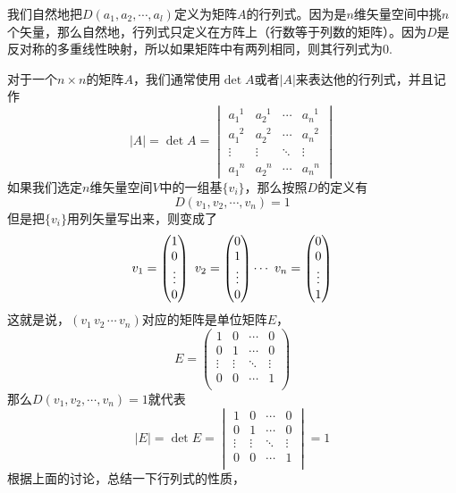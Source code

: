 \documentclass[11pt,a4paper,openany]{book}%
\theoremstyle{plain}%
\begin{document}
\indent 我们自然地把$D(a_1,a_2,\cdots,a_l)$定义为矩阵$A$的行列式。因为是$n$维矢量空间中挑$n$个矢量，那么自然地，行列式只定义在方阵上（行数等于列数的矩阵）。因为$D$是反对称的多重线性映射，所以如果矩阵中有两列相同，则其行列式为0.

对于一个$n\times n$的矩阵$A$，我们通常使用$\det A$或者$|A|$来表达他的行列式，并且记作
\[
|A|=\det A=
\begin{vmatrix}
a_{1}^{\phantom{1}1} & a_{2}^{\phantom{2}1} & \cdots & a_{n}^{\phantom{n}1}\\
a_{1}^{\phantom{1}2} & a_{2}^{\phantom{2}2} & \cdots & a_{n}^{\phantom{n}2}\\
\vdots & \vdots & \ddots & \vdots \\
a_{1}^{\phantom{1}n} & a_{2}^{\phantom{2}n} & \cdots & a_{n}^{\phantom{n}n}
\end{vmatrix}
\]
\indent 如果我们选定$n$维矢量空间$V$中的一组基$\{v_i\}$，那么按照$D$的定义有
\[
D(v_1,v_2,\cdots,v_n)=1
\]
但是把$\{v_i\}$用列矢量写出来，则变成了
\[
v_1=\begin{pmatrix}
1 \\
0 \\
\vdots \\
0\\
\end{pmatrix}
\,\,
v_2=\begin{pmatrix}
0 \\
1 \\
\vdots \\
0\\
\end{pmatrix}
\cdots\\
\,\,
v_n=\begin{pmatrix}
0 \\
0 \\
\vdots \\
1\\
\end{pmatrix}
\]
这就是说，$(v_1\, v_2\, \cdots\, v_n)$对应的矩阵是单位矩阵$E$，
\[
E=\begin{pmatrix}
1 & 0 & \cdots & 0\\
0 & 1 & \cdots & 0\\
\vdots & \vdots & \ddots & \vdots \\
0 & 0 & \cdots & 1\\
\end{pmatrix}
\]
那么$D(v_1,v_2,\cdots,v_n)=1$就代表
\[
|E|=\det E=
\begin{vmatrix}
1 & 0 & \cdots & 0\\
0 & 1 & \cdots & 0\\
\vdots & \vdots & \ddots & \vdots \\
0 & 0 & \cdots & 1\\
\end{vmatrix}
=1
\]
根据上面的讨论，总结一下行列式的性质，
\end{document}
